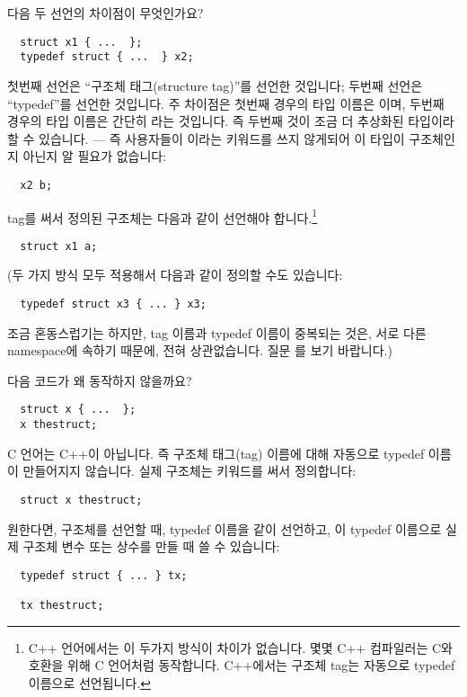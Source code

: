 \begin{faq}
	다음 두 선언의 차이점이 무엇인가요?

\begin{verbatim}
  struct x1 { ...  };
  typedef struct { ...  } x2;
\end{verbatim}

\A
	첫번째 선언은 ``구조체 태그(structure tag)''를 선언한 것입니다; 두번째 선언은
	``typedef''를 선언한 것입니다.  주 차이점은 첫번째 경우의 타입 이름은
	이며, 두번째 경우의 타입 이름은 간단히 라는
	것입니다.  즉 두번째 것이 조금 더 추상화된 타입이라 할 수 있습니다.
	--- 즉 사용자들이 이라는 키워드를 쓰지 않게되어 이 타입이
	구조체인지 아닌지 알 필요가 없습니다:
\begin{verbatim}
  x2 b;
\end{verbatim}
        tag를 써서 정의된 구조체는 다음과 같이 선언해야 합니다.\footnote{C++ 언어에서는
        이 두가지 방식이 차이가 없습니다. 몇몇 C++ 컴파일러는 C와 호환을 위해
        C 언어처럼 동작합니다. C++에서는 구조체 tag는 자동으로 typedef 이름으로
        선언됩니다.}
\begin{verbatim}
  struct x1 a;
\end{verbatim}
        (두 가지 방식 모두 적용해서 다음과 같이 정의할 수도 있습니다:
\begin{verbatim}
  typedef struct x3 { ... } x3;
\end{verbatim}
        조금 혼동스럽기는 하지만, tag 이름과 typedef 이름이 중복되는 것은,
        서로 다른 namespace에 속하기 때문에, 전혀 상관없습니다.
        질문 를 보기 바랍니다.)

\end{faq}

\begin{faq}
	다음 코드가 왜 동작하지 않을까요?

\begin{verbatim}
  struct x { ...  };
  x thestruct;
\end{verbatim}

\A
	C 언어는 C++이 아닙니다.  즉 구조체 태그(tag) 이름에 대해 자동으로
	typedef 이름이 만들어지지 않습니다. 실제 구조체는 
        키워드를 써서 정의합니다:
\begin{verbatim}
  struct x thestruct;
\end{verbatim}
        원한다면, 구조체를 선언할 때, typedef 이름을 같이 선언하고, 이 typedef 이름으로
        실제 구조체 변수 또는 상수를 만들 때 쓸 수 있습니다:
\begin{verbatim}
  typedef struct { ... } tx;
  
  tx thestruct;
\end{verbatim}
\end{faq}


